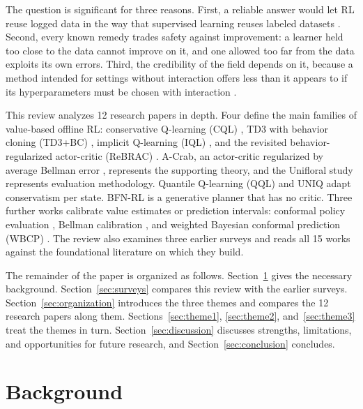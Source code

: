 \documentclass[journal]{IEEEtran}
\begin{document}
The question is significant for three reasons. First, a reliable answer would let RL reuse logged data in the way that supervised learning reuses labeled datasets \cite{levine2020tutorial}. Second, every known remedy trades safety against improvement: a learner held too close to the data cannot improve on it, and one allowed too far from the data exploits its own errors. Third, the credibility of the field depends on it, because a method intended for settings without interaction offers less than it appears to if its hyperparameters must be chosen with interaction \cite{paine2020hyperparameter,kurenkov2022budget}.

This review analyzes 12 research papers in depth. Four define the main families of value-based offline RL: conservative Q-learning (CQL) \cite{kumar2020cql}, TD3 with behavior cloning (TD3+BC) \cite{fujimoto2021td3bc}, implicit Q-learning (IQL) \cite{kostrikov2022iql}, and the revisited behavior-regularized actor-critic (ReBRAC) \cite{tarasov2023rebrac}. A-Crab, an actor-critic regularized by average Bellman error \cite{zhu2023acrab}, represents the supporting theory, and the Unifloral study \cite{jackson2025unifloral} represents evaluation methodology. Quantile Q-learning (QQL) \cite{gao2026qql} and UNIQ \cite{upadhyay2026uniq} adapt conservatism per state. BFN-RL \cite{killingberg2026bfn} is a generative planner that has no critic. Three further works calibrate value estimates or prediction intervals: conformal policy evaluation \cite{gan2025conformal}, Bellman calibration \cite{vanderlaan2026bellman}, and weighted Bayesian conformal prediction (WBCP) \cite{lou2026wbcp}. The review also examines three earlier surveys \cite{levine2020tutorial,he2023survey,prudencio2024survey} and reads all 15 works against the foundational literature on which they build.

The remainder of the paper is organized as follows. Section~\ref{sec:background} gives the necessary background. Section~\ref{sec:surveys} compares this review with the earlier surveys. Section~\ref{sec:organization} introduces the three themes and compares the 12 research papers along them. Sections~\ref{sec:theme1}, \ref{sec:theme2}, and~\ref{sec:theme3} treat the themes in turn. Section~\ref{sec:discussion} discusses strengths, limitations, and opportunities for future research, and Section~\ref{sec:conclusion} concludes.

\section{Background}
\label{sec:background}
\end{document}
